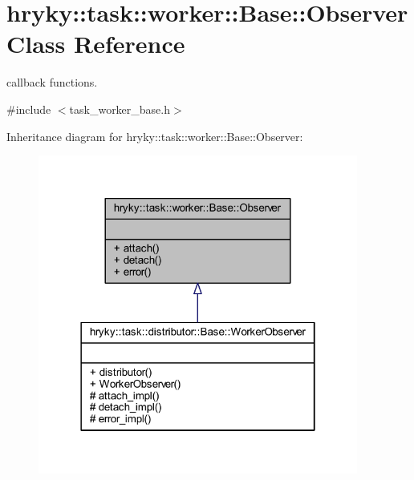 \hypertarget{classhryky_1_1task_1_1worker_1_1_base_1_1_observer}{\section{hryky\-:\-:task\-:\-:worker\-:\-:Base\-:\-:Observer Class Reference}
\label{classhryky_1_1task_1_1worker_1_1_base_1_1_observer}
}


callback functions.  




{\ttfamily \#include $<$task\-\_\-worker\-\_\-base.\-h$>$}



Inheritance diagram for hryky\-:\-:task\-:\-:worker\-:\-:Base\-:\-:Observer\-:\nopagebreak
\begin{figure}[H]
\begin{center}
\leavevmode
\includegraphics[width=298pt]{classhryky_1_1task_1_1worker_1_1_base_1_1_observer__inherit__graph}
\end{center}
\end{figure}
